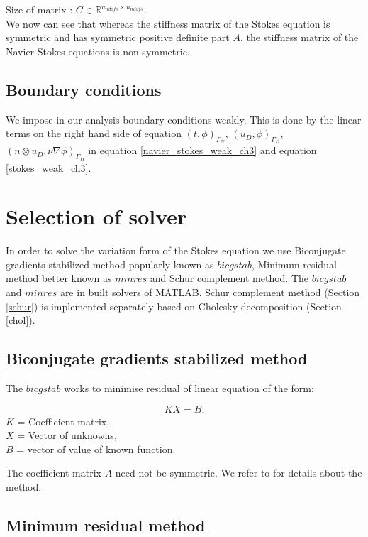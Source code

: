 \documentclass[a4paper,twoside,openright]{book}
\begin{document}
Size of matrix : $C \in \mathbb{R}^{u_{ndofs} \times u_{ndofs}}$. \\

We now can see that whereas the stiffness matrix of the Stokes equation is symmetric and has symmetric positive definite part $A$, the stiffness matrix of the Navier-Stokes equations is non symmetric.

\subsection{Boundary conditions}

We impose in our analysis boundary conditions weakly. This is done by the linear terms on the right hand side of equation  $(t,\phi)_{\Gamma_N}$, $(u_D,\phi)_{\Gamma_D}$, $(n \otimes u_D, \nu \nabla \phi)_{\Gamma_D}$ in equation \eqref{navier_stokes_weak_ch3} and equation \eqref{stokes_weak_ch3}.

\section{Selection of solver}

In order to solve the variation form of the Stokes equation we use Biconjugate gradients stabilized method popularly known as $bicgstab$, Minimum residual method better known as $minres$ and Schur complement method. The $bicgstab$ and $minres$ are in built solvers of MATLAB. Schur complement method (Section \ref{schur}) is implemented separately based on Cholesky decomposition (Section \ref{chol}).

\subsection{Biconjugate gradients stabilized method}

The $bicgstab$ works to minimise residual of linear equation of the form:

\begin{equation} \label{linear_matrix_equation}
KX = B \textrm{,}
\end{equation}
\noindent
$K$ = Coefficient matrix, \\
$X$ = Vector of unknowns, \\ 
$B$ = vector of value of known function. 

The coefficient matrix $A$ need not be symmetric. We refer to \cite{bicgstab} for details about the method.\\

\subsection{Minimum residual method} 
\end{document}
